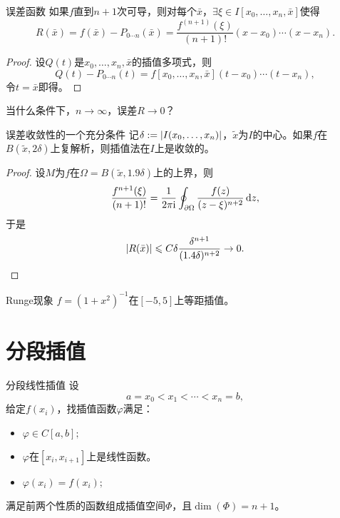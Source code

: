 \begin{theorem}
    {误差函数}{}
    如果$f$直到$n+1$次可导，则对每个$\bar x$，$\exists\xi\in I[x_0,\ldots,x_n,\bar x]$使得
    \begin{equation}
        R(\bar x)=f(\bar x)-P_{0\cdots n}(\bar x)=\frac{f^{(n+1)}(\xi)}{(n+1)!}(x-x_0)\cdots(x-x_n).
    \end{equation}
\end{theorem}

\begin{proof}
    设$Q(t)$是$x_0,\ldots,x_n,\bar x$的插值多项式，则
    \[
        Q(t)-P_{0\cdots n}(t)=f[x_0,\ldots,x_n,\bar x](t-x_0)\cdots(t-x_n),
    \]
    令$t=\bar x$即得。
\end{proof}

当什么条件下，$n\to\infty$，误差$R\to 0$？
\begin{theorem}
    {误差收敛性的一个充分条件}{}
    记$\delta:=\left\lvert I(x_0,\ldots,x_n)\right\rvert$，$\tilde x$为$I$的中心。如果$f$在$B(\tilde x,2\delta)$上复解析，则插值法在$I$上是收敛的。
\end{theorem}

\begin{proof}
    设$M$为$f$在$\Omega=B(\tilde x,1.9\delta)$上的上界，则
    \begin{equation}
        \frac{f^{n+1}(\xi)}{(n+1)!}=\frac1{2\pi\mathrm{i}}\oint_{\partial\Omega}\frac{f(z)}{(z-\xi)^{n+2}}\mathop{}\!\mathrm{d} z,
    \end{equation}
    于是
    \begin{equation*}
        \left\lvert R(\bar x)\right\rvert\leqslant C\delta\frac{\delta^{n+1}}{(1.4\delta)^{n+2}}\to 0.
        \qedhere
    \end{equation*}
\end{proof}

\begin{example}
    {Runge现象}{}
    $f=(1+x^2)^{-1}$在$[-5,5]$上等距插值。
\end{example}

\section{分段插值}
\label{sec:piecewise interpolation}

\begin{definition}
    {分段线性插值}{}
    设
    \[
        a=x_0<x_1<\cdots<x_n=b,
    \]
    给定$f(x_i)$，找插值函数$\varphi$满足：
    \begin{itemize}
        \item $\varphi\in C[a,b];$
        \item $\varphi$在$[x_i,x_{i+1}]$上是线性函数。
        \item $\varphi(x_i)=f(x_i);$
    \end{itemize}
    满足前两个性质的函数组成插值空间$\Phi$，且$\dim(\Phi)=n+1$。
\end{definition}

